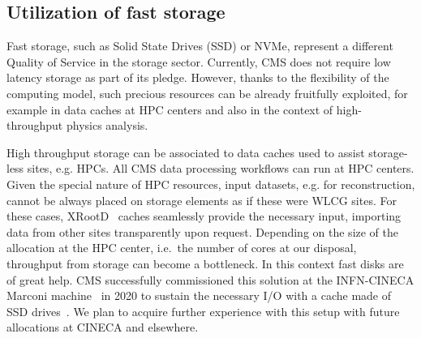 \documentclass{cmspaper}
\begin{document}
\subsection{Utilization of fast storage}
\label{subsec:fast_storage}

Fast storage, such as Solid State Drives (SSD) or NVMe, represent a different Quality of Service in the storage sector. Currently, CMS does not require low latency storage as part of its pledge. However, thanks to the flexibility of the computing model, such precious resources can be already fruitfully exploited, for example in data caches at HPC centers and also in the context of high-throughput physics analysis.


High throughput storage can be associated to data caches used to assist storage-less sites, e.g. HPCs. All CMS data processing workflows can run at HPC centers. Given the special nature of HPC resources, input datasets, e.g. for reconstruction, cannot be always placed on storage elements as if these were WLCG sites. For these cases, XRootD~\cite{xrootd2005} caches seamlessly provide the necessary input, importing data from other sites transparently upon request. Depending on the size of the allocation at the HPC center, i.e.~the number of cores at our disposal, throughput from storage can become a bottleneck. In this context fast disks are of great help. CMS successfully commissioned this solution at the INFN-CINECA Marconi machine~\cite{marconi} in 2020 to sustain the necessary I/O with a cache made of SSD drives~\cite{spiga_cache_cineca}. We plan to acquire further experience with this setup with future allocations at CINECA and elsewhere.
\end{document}
